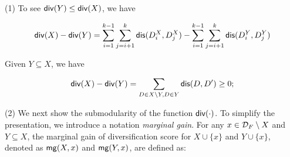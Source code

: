 \sstab
(1) To see ${\mathsf{div}}(Y) \leq {\ensuremath{\mathsf{div}}}(X)$, we have 

\begin{small}
\begin{equation*}
{\ensuremath{\mathsf{div}}}(X) - {\mathsf{div}}(Y)
= \sum_{i=1}^{k-1}
\sum_{j=i+1}^{k} {\mathsf{dis}}(D_i^X, D_j^X) - \sum_{i=1}^{k-1} \sum_{j=i+1}^{k} {\mathsf{dis}}(D_i^Y, D_j^Y) 
\end{equation*}
\end{small}
Given $Y \subseteq X$, 
we have 
\\
\begin{small}
\begin{equation*}
{\ensuremath{\mathsf{div}}}(X) -{\mathsf{div}}(Y) = \sum_{D\in X\setminus Y, D\in Y}{\mathsf{dis}}(D,D')\geq 0;  
\end{equation*}
\end{small}

(2) We next show the submodularity of the function ${\mathsf{div}}(\cdot)$. 
To simplify the presentation, 
we introduce a notation {\em marginal gain}. 
For any $x \in {\mathcal D}_F \setminus X$ and $Y \subseteq X$, the marginal gain
of diversification score for  $X \cup \{x\}$ and  $Y \cup \{x\}$, denoted as ${\mathsf{mg}}(X,x)$ and ${\mathsf{mg}}(Y,x)$, %
are defined as: 

